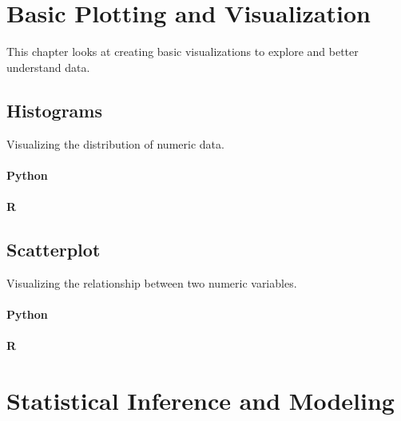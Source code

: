 \documentclass[
]{book}
\begin{document}
\hypertarget{basic-plotting-and-visualization}{%
\chapter{Basic Plotting and Visualization}\label{basic-plotting-and-visualization}}

This chapter looks at creating basic visualizations to explore and better understand data.

\hypertarget{histograms}{%
\section{Histograms}\label{histograms}}

Visualizing the distribution of numeric data.

\hypertarget{python-33}{%
\subsubsection*{Python}\label{python-33}}

\hypertarget{r-33}{%
\subsubsection*{R}\label{r-33}}

\hypertarget{scatterplot}{%
\section{Scatterplot}\label{scatterplot}}

Visualizing the relationship between two numeric variables.

\hypertarget{python-34}{%
\subsubsection*{Python}\label{python-34}}

\hypertarget{r-34}{%
\subsubsection*{R}\label{r-34}}

\hypertarget{statistical-inference-and-modeling}{%
\chapter{Statistical Inference and Modeling}\label{statistical-inference-and-modeling}}
\end{document}
